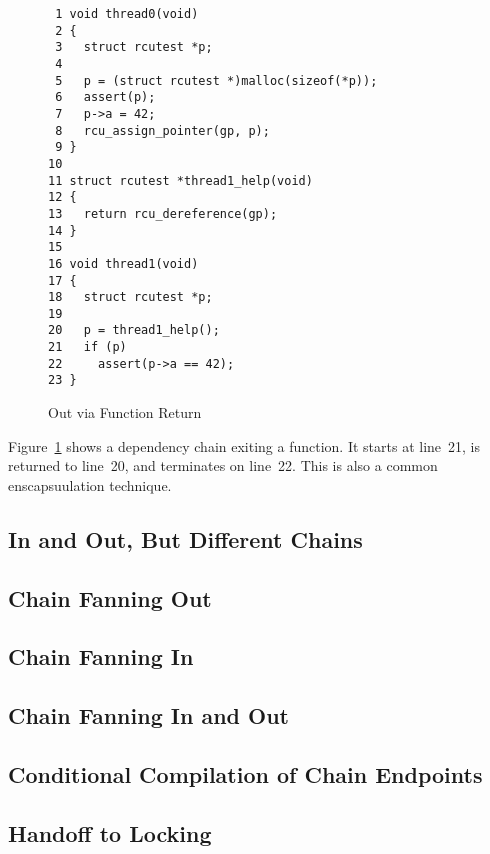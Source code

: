 \documentclass[letterpaper,twocolumn,10pt]{article}
\begin{document}
\begin{figure}[tbp]
{ \scriptsize
\begin{verbatim}
 1 void thread0(void)
 2 {
 3   struct rcutest *p;
 4
 5   p = (struct rcutest *)malloc(sizeof(*p));
 6   assert(p);
 7   p->a = 42;
 8   rcu_assign_pointer(gp, p);
 9 }
10
11 struct rcutest *thread1_help(void)
12 {
13   return rcu_dereference(gp);
14 }
15
16 void thread1(void)
17 {
18   struct rcutest *p;
19
20   p = thread1_help();
21   if (p)
22     assert(p->a == 42);
23 }
\end{verbatim}
}
\caption{Out via Function Return}
\label{fig:Out via Function Return}
\end{figure}

Figure~\ref{fig:Out via Function Return}
shows a dependency chain exiting a function.
It starts at line~21, is returned to line~20, and
terminates on line~22.
This is also a common enscapsuulation technique.

\subsection{In and Out, But Different Chains}
\label{sec:In and Out, But Different Chains}

\subsection{Chain Fanning Out}
\label{sec:Chain Fanning Out}

\subsection{Chain Fanning In}
\label{sec:Chain Fanning In}

\subsection{Chain Fanning In and Out}
\label{sec:Chain Fanning In and Out}

\subsection{Conditional Compilation of Chain Endpoints}
\label{sec:Conditional Compilation of Chain Endpoints}

\subsection{Handoff to Locking}
\label{sec:Handoff to Locking}
\end{document}
